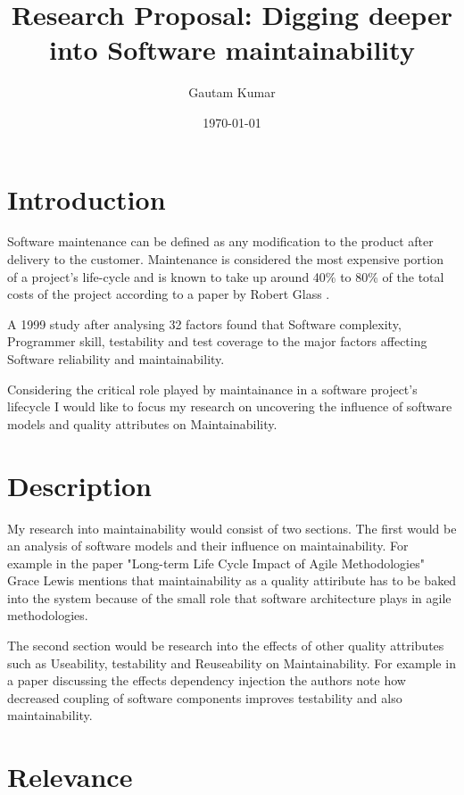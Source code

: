 \documentclass[dvips,12pt]{article}
\begin{document}

\title{Research Proposal: Digging deeper into Software maintainability}
\author{Gautam Kumar}
\date{\today}


\maketitle


\section{Introduction}

Software maintenance can be defined as any modification to the product after delivery to the customer. Maintenance is considered the most expensive portion of a project's life-cycle and is known to take up around 40\% to 80\% of the total costs of the project according to a paper by Robert Glass \cite{glass_frequently_2001}. 

A 1999 study\cite{zhang_analysis_2000} after analysing 32 factors found that Software complexity, Programmer skill, testability and test coverage to the major factors affecting Software reliability and maintainability.

Considering the critical role played by maintainance in a software project's lifecycle I would like to focus my research on uncovering the influence of software models and quality attributes on Maintainability.

\section{Description}

My research into maintainability would consist of two sections. The first would be an analysis of software models and their influence on maintainability. For example in the paper "Long-term Life Cycle Impact of Agile Methodologies" \cite{kajko-mattsson_long-term_2006} Grace Lewis mentions that maintainability as a quality attiribute has to be baked into the system because of the small role that software architecture plays in agile methodologies. 

The second section would be research into the effects of other quality attributes such as Useability, testability and Reuseability on Maintainability. For example in a paper discussing the effects dependency injection \cite{razina_effects_2007} the authors note how decreased coupling of software components improves testability and also maintainability. 

\section{Relevance}



\end{document}
